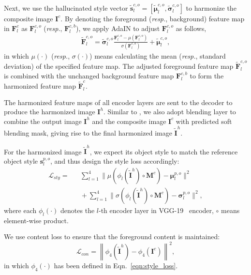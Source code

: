 \documentclass[letterpaper]{article} %
\begin{document}
Next, we use the hallucinated style vector $\tilde{\bm{s}}^{c,o}_l=[\tilde{\bm{\mu}}^{c,o}_l, \tilde{\bm{\sigma}}^{c,o}_l]$ to harmonize the composite image  $\bm{I}^c$. By denoting the foreground (\emph{resp.}, background) feature map in $\bm{F}_l^c$ as $\bm{F}^{c,o}_l$ (\emph{resp.}, $\bm{F}^{c,b}_l$), we apply AdaIN to adjust $\bm{F}^{c,o}_l$ as follows,
\begin{eqnarray}\label{eqn:adain}
\tilde{\bm{F}}^{c,o}_{l} = \tilde{\bm{\sigma}}^{c,o}_l\frac{\bm{F}^{c,o}_l-\mu(\bm{F}^{c,o}_l)}{\sigma(\bm{F}^{c,o}_l)} + \tilde{\bm{\mu}}^{c,o}_l,
\end{eqnarray}
in which $\mu(\cdot)$ (\emph{resp.}, $\sigma(\cdot)$) means calculating the mean (\emph{resp.}, standard deviation) of the specified feature map. The adjusted foreground feature map $\tilde{\bm{F}}^{c,o}_{l}$ is combined with the unchanged background feature map $\bm{F}^{c,b}_l$ to form the harmonized feature map $\tilde{\bm{F}}^{c}_{l}$.

The harmonized feature maps of all encoder layers are sent to the decoder to produce the harmonized image $\bm{I}^h$. Similar to \cite{cao2022painterly}, we also adopt blending layer to combine the output image $\bm{I}^h$ and the composite image $\bm{I}^c$ with predicted soft blending mask, giving rise to the final harmonized image $\tilde{\bm{I}}^h$.

For the harmonized image $\tilde{\bm{I}}^h$, we expect its object style to match the reference object style $\bm{s}^{p,o}_l$, and thus design the style loss accordingly:
\begin{eqnarray}\label{eqn:style_loss}
\mathcal{L}_{sty} =\!\!\!\!\!\!\!\!\!\!\!\!&&\sum_{l=1}^{4}\|\mu\left(\phi_{l}(\tilde{\bm{I}}^h)\circ \bm{M}^c\right)-\bm{\mu}^{p,o}_l \|^2 \nonumber\\
&&\!\!\!\!\!\!\!\!\!\!\!\!+ \sum_{l=1}^{4}\|\sigma\left(\phi_{l}(\tilde{\bm{I}}^h)\circ \bm{M}^c\right)-\bm{\sigma}^{p,o}_l \|^2,
\end{eqnarray}
where each $\phi_{l}(\cdot)$ denotes the $l$-th encoder layer in VGG-19~\cite{VGG19} encoder, $\circ$ means element-wise product.

We use content loss \cite{gatys2016image} to ensure that the foreground content is maintained:
\begin{equation}\label{eqn:content_loss}
\mathcal{L}_{con} =\left\|\phi_4(\tilde{\bm{I}}^h)-\phi_4(\bm{I}^c)\right\|^2,
\end{equation}
in which $\phi_{4}(\cdot)$ has been defined in Eqn.~\ref{eqn:style_loss}.
\end{document}

